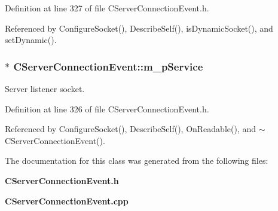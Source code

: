 Definition at line 327 of file CServer\-Connection\-Event.h.

Referenced by Configure\-Socket(), Describe\-Self(), is\-Dynamic\-Socket(), and set\-Dynamic().
\subsubsection{$\ast$ CServer\-Connection\-Event::m\_\-p\-Service\hspace{0.3cm}{\tt  [private]}}\label{classCServerConnectionEvent_o0}


Server listener socket.



Definition at line 326 of file CServer\-Connection\-Event.h.

Referenced by Configure\-Socket(), Describe\-Self(), On\-Readable(), and $\sim$CServer\-Connection\-Event().

The documentation for this class was generated from the following files:\begin{CompactItemize}
\item 
{\bf CServer\-Connection\-Event.h}\item 
{\bf CServer\-Connection\-Event.cpp}\end{CompactItemize}
